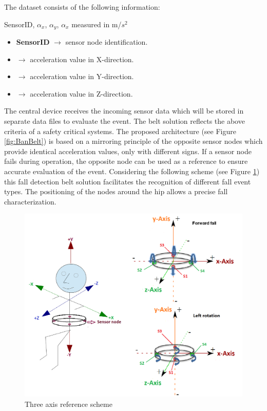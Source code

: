 \documentclass[10pt,journal,compsoc]{IEEEtran}
\begin{document}
The dataset consists of the following information: 
\begin{center}
	SensorID, $\alpha_{x}$, $\alpha_{y}$, $\alpha_{x}$ measured in m/$s^2$
\end{center}
\begin{itemize}
	\item \textbf{SensorID} $\rightarrow$ sensor node identification.
	\item {} $\rightarrow$ acceleration value in X-direction.
	\item {} $\rightarrow$ acceleration value in Y-direction.
	\item {} $\rightarrow$ acceleration value in Z-direction.
\end{itemize} 
The central device receives the incoming sensor data which will be stored in separate data files to evaluate the event. 
The belt solution reflects the above criteria of a safety critical systems. The proposed architecture (see Figure \ref{fig:BanBelt}) is based on a mirroring principle of the opposite sensor nodes which provide identical acceleration values, only with different signs. If a sensor node fails during operation, the opposite node can be used as a reference to ensure accurate evaluation of the event.  Considering the following scheme (see Figure \ref{fig:ReferenceScheme}) this fall detection belt solution facilitates the recognition of different fall event types. The positioning of the nodes around the hip allows a precise fall characterization.
\begin{figure}[!ht]
	\centering
	\includegraphics[scale=0.2]{images/axis}
	\caption[Three axis reference scheme]{Three axis reference scheme \cite{LaBlunda.2016,LuigiMasterThesis}}
	\label{fig:ReferenceScheme}
\end{figure}
\end{document}
